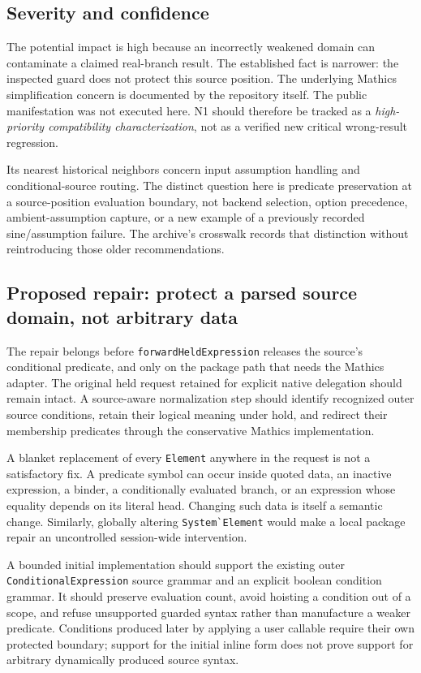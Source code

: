 \documentclass[11pt,a4paper]{article}
\newcommand{\code}[1]{\nolinkurl{#1}}
\begin{document}
\subsection{Severity and confidence}
The potential impact is high because an incorrectly weakened domain can contaminate a claimed real-branch result. The established fact is narrower: the inspected guard does not protect this source position. The underlying Mathics simplification concern is documented by the repository itself. The public manifestation was not executed here. N1 should therefore be tracked as a \emph{high-priority compatibility characterization}, not as a verified new critical wrong-result regression.

Its nearest historical neighbors concern input assumption handling and conditional-source routing. The distinct question here is predicate preservation at a source-position evaluation boundary, not backend selection, option precedence, ambient-assumption capture, or a new example of a previously recorded sine/assumption failure. The archive's crosswalk records that distinction without reintroducing those older recommendations.\cite{status,wave3}

\subsection{Proposed repair: protect a parsed source domain, not arbitrary data}
The repair belongs before \code{forwardHeldExpression} releases the source's conditional predicate, and only on the package path that needs the Mathics adapter. The original held request retained for explicit native delegation should remain intact. A source-aware normalization step should identify recognized outer source conditions, retain their logical meaning under hold, and redirect their membership predicates through the conservative Mathics implementation.

A blanket replacement of every \code{Element} anywhere in the request is not a satisfactory fix. A predicate symbol can occur inside quoted data, an inactive expression, a binder, a conditionally evaluated branch, or an expression whose equality depends on its literal head. Changing such data is itself a semantic change. Similarly, globally altering \code{System`Element} would make a local package repair an uncontrolled session-wide intervention.

A bounded initial implementation should support the existing outer \code{ConditionalExpression} source grammar and an explicit boolean condition grammar. It should preserve evaluation count, avoid hoisting a condition out of a scope, and refuse unsupported guarded syntax rather than manufacture a weaker predicate. Conditions produced later by applying a user callable require their own protected boundary; support for the initial inline form does not prove support for arbitrary dynamically produced source syntax.
\end{document}
